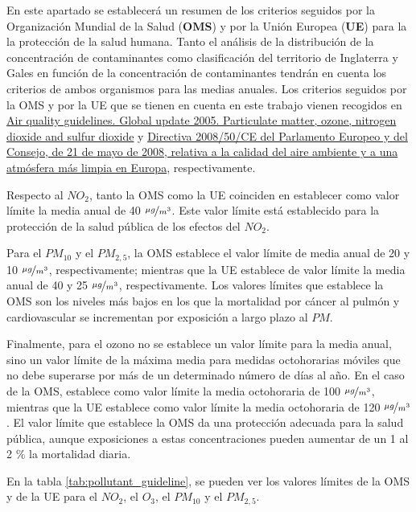 \documentclass[12pt]{article}
\begin{document}
En este apartado se establecerá un resumen de los criterios seguidos por la Organización Mundial de la Salud (\textbf{OMS}) y por la Unión Europea (\textbf{UE}) para la la protección de la salud humana. Tanto el análisis de la distribución de la concentración de contaminantes como clasificación del territorio de Inglaterra y Gales en función de la concentración de contaminantes tendrán en cuenta los criterios de ambos organismos para las medias anuales. Los criterios seguidos por la OMS y por la UE que se tienen en cuenta en este trabajo vienen recogidos en \href{http://www.euro.who.int/en/health-topics/environment-and-health/Housing-and-health/publications/pre-2009/air-quality-guidelines.-global-update-2005.-particulate-matter,-ozone,-nitrogen-dioxide-and-sulfur-dioxide}{Air quality guidelines. Global update 2005. Particulate matter, ozone, nitrogen dioxide and sulfur dioxide} y \href{https://www.boe.es/buscar/doc.php?id=DOUE-L-2008-81053}{Directiva 2008/50/CE del Parlamento Europeo y del Consejo, de 21 de mayo de 2008, relativa a la calidad del aire ambiente y a una atmósfera más limpia en Europa}, respectivamente.

Respecto al $NO_{2}$, tanto la OMS como la UE coinciden en establecer como valor límite la media anual de 40 $\nicefrac{\mu g}{m^{3}}$. Este valor límite está establecido para la protección de la salud pública de los efectos del $NO_{2}$.

Para el $PM_{10}$ y el $PM_{2,5}$, la OMS establece el valor límite de media anual de 20 y 10 $\nicefrac{\mu g}{m^{3}}$, respectivamente; mientras que la UE establece de valor límite la media anual de 40 y 25 $\nicefrac{\mu g}{m^{3}}$, respectivamente. Los valores límites que establece la OMS son los niveles más bajos en los que la mortalidad por cáncer al pulmón y cardiovascular se incrementan por exposición a largo plazo al $PM$.

Finalmente, para el ozono no se establece un valor límite para la media anual, sino un valor límite de la máxima media para medidas octohorarias móviles que no debe superarse por más de un determinado número de días al año. En el caso de la OMS, establece como valor límite la media octohoraria de 100 $\nicefrac{\mu g}{m^{3}}$, mientras que la UE establece como valor límite la media octohoraria de 120 $\nicefrac{\mu g}{m^{3}}$. El valor límite que establece la OMS da una protección adecuada para la salud pública, aunque exposiciones a estas concentraciones pueden aumentar de un 1 al 2 $\%$ la mortalidad diaria.

En la tabla \ref{tab:pollutant_guideline}, se pueden ver los valores límites de la OMS y de la UE para el $NO_{2}$, el $O_{3}$, el $PM_{10}$ y el $PM_{2,5}$.
\end{document}
